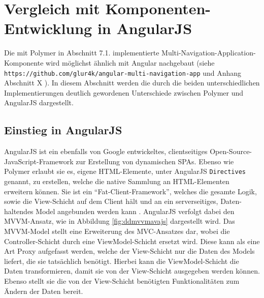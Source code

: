 \section{Vergleich mit Komponenten-Entwicklung in AngularJS}\label{vergleich-mit-komponenten-entwicklung-in-angularjs}

Die mit Polymer in Abschnitt 7.1. implementierte Multi-Navigation-Application-Komponente wird möglichst ähnlich mit Angular nachgebaut (siehe \texttt{https://github.com/glur4k/angular-multi-navigation-app} und Anhang Abschnitt X ). In diesem Abschnitt werden die durch die beiden unterschiedlichen Implementierungen deutlich gewordenen Unterschiede zwischen Polymer und AngularJS dargestellt.


\subsection{Einstieg in AngularJS}\label{einstieg-in-angularjs}

AngularJS ist ein ebenfalls von Google entwickeltes, clientseitiges Open-Source-JavaScript-Framework zur Erstellung von dynamischen \ac{SPA}s. Ebenso wie Polymer erlaubt sie es, eigene \ac{HTML}-Elemente, unter AngularJS \texttt{Directives} genannt, zu erstellen, welche die native Sammlung an \ac{HTML}-Elementen erweitern können. Sie ist ein ``Fat-Client-Framework'', welches die gesamte Logik, sowie die View-Schicht auf dem Client hält und an ein serverseitiges, Daten-haltendes Model angebunden werden kann \cite{citeulike:13920434}. AngularJS verfolgt dabei den \ac{MVVM}-Ansatz, wie in Abbildung \ref{fig:ddmvvmavajs} dargestellt wird. Das \ac{MVVM}-Model stellt eine Erweiterung des \ac{MVC}-Ansatzes dar, wobei die Controller-Schicht durch eine ViewModel-Schicht ersetzt wird. Diese kann als eine Art Proxy aufgefasst werden, welche der View-Schicht nur die Daten des Models liefert, die sie tatsächlich benötigt. Hierbei kann die ViewModel-Schicht die Daten transformieren, damit sie von der View-Schicht ausgegeben werden können. Ebenso stellt sie die von der View-Schicht benötigten Funktionalitäten zum Ändern der Daten bereit.

